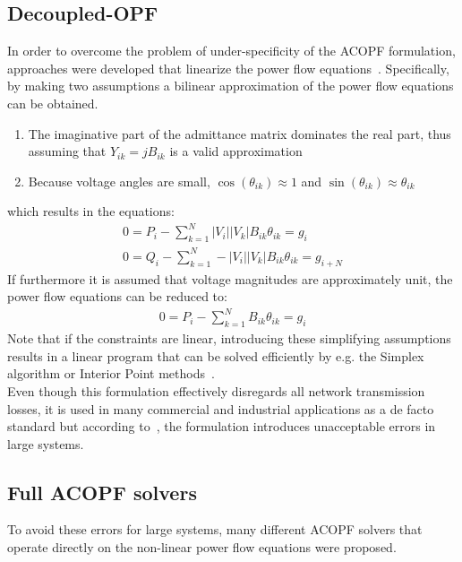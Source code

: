 \documentclass[11pt]{cmuthesis} %
\begin{document}
\subsection{Decoupled-OPF}
In order to overcome the problem of under-specificity of the ACOPF formulation, approaches were developed that linearize the power flow equations~\cite{stott1974fast}. Specifically, by making two assumptions a bilinear approximation of the power flow equations can be obtained.
\begin{enumerate}
\item The imaginative part of the admittance matrix dominates the real part, thus assuming that $Y_{ik} = jB_{ik}$ is a valid approximation
\item Because voltage angles are small, $\cos(\theta_{ik}) \approx 1$ and $\sin(\theta_{ik}) \approx \theta_{ik}$
\end{enumerate}
which results in the equations:
\begin{align*}
0 = P_i - \sum_{k=1}^N |V_i||V_k| B_{ik} \theta_{ik} = g_i\\
0 = Q_i - \sum_{k=1}^N -|V_i||V_k| B_{ik} \theta_{ik} = g_{i+N}
\end{align*}
If furthermore it is assumed that voltage magnitudes are approximately unit, the power flow equations can be reduced to:
\begin{align*}
0 = P_i - \sum_{k=1}^N B_{ik} \theta_{ik} = g_i
\end{align*}
 Note that if the constraints are linear, introducing these simplifying assumptions results in a linear program that can be solved efficiently by e.g. the Simplex algorithm or Interior Point methods~\cite{klee1970good}.\\
Even though this formulation effectively disregards all network transmission losses, it is used in many commercial and industrial applications as a de facto standard but according to~\cite{stott2009dc}, the formulation introduces unacceptable errors in large systems.

\subsection{Full ACOPF solvers}
To avoid these errors for large systems, many different ACOPF solvers that operate directly on the non-linear power flow equations were proposed.
\end{document}
